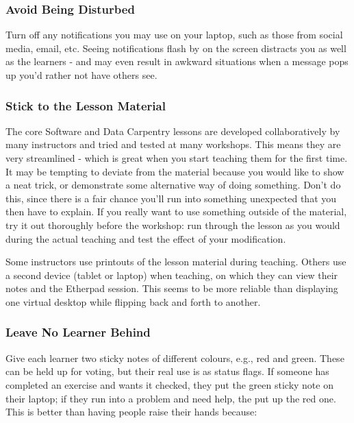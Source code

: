\subsubsection{Avoid Being Disturbed}\label{avoid-being-disturbed}

Turn off any notifications you may use on your laptop, such as those
from social media, email, etc. Seeing notifications flash by on the
screen distracts you as well as the learners - and may even result in
awkward situations when a message pops up you'd rather not have others
see.

\subsubsection{Stick to the Lesson
Material}\label{stick-to-the-lesson-material}

The core Software and Data Carpentry lessons are developed
collaboratively by many instructors and tried and tested at many
workshops. This means they are very streamlined - which is great when
you start teaching them for the first time. It may be tempting to
deviate from the material because you would like to show a neat trick,
or demonstrate some alternative way of doing something. Don't do this,
since there is a fair chance you'll run into something unexpected that
you then have to explain. If you really want to use something outside of
the material, try it out thoroughly before the workshop: run through the
lesson as you would during the actual teaching and test the effect of
your modification.

Some instructors use printouts of the lesson material during teaching.
Others use a second device (tablet or laptop) when teaching, on which
they can view their notes and the Etherpad session. This seems to be
more reliable than displaying one virtual desktop while flipping back
and forth to another.

\subsubsection{Leave No Learner Behind}\label{leave-no-learner-behind}

Give each learner two sticky notes of different colours, e.g., red and
green. These can be held up for voting, but their real use is as status
flags. If someone has completed an exercise and wants it checked, they
put the green sticky note on their laptop; if they run into a problem
and need help, the put up the red one. This is better than having people
raise their hands because:

